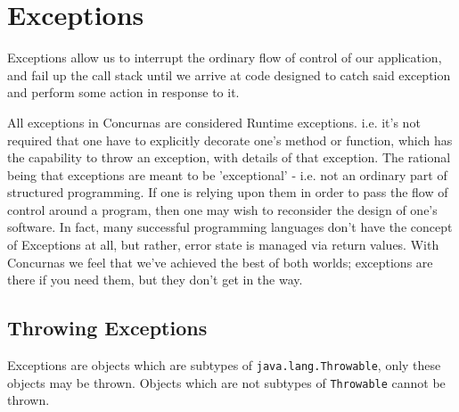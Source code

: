 \documentclass[conc-doc]{subfiles}
\begin{document}
	
	\chapter[Exceptions]{Exceptions}



Exceptions allow us to interrupt the ordinary flow of control of our application, and fail up the call stack until we arrive at code designed to catch said exception and perform some action in response to it. 

All exceptions in Concurnas are considered Runtime exceptions. i.e. it's not required that one have to explicitly decorate one's method or function, which has the capability to throw an exception, with details of that exception. The rational being that exceptions are meant to be 'exceptional' - i.e. not an ordinary part of structured programming. If one is relying upon them in order to pass the flow of control around a program, then one may wish to reconsider the design of one's software. In fact, many successful programming languages don't have the concept of Exceptions at all, but rather, error state is managed via return values. With Concurnas we feel that we've achieved the best of both worlds; exceptions are there if you need them, but they don't get in the way.

\section{Throwing Exceptions}
Exceptions are objects which are subtypes of \lstinline{java.lang.Throwable}, only these objects may be thrown. Objects which are not subtypes of \lstinline{Throwable} cannot be thrown.
\end{document}
